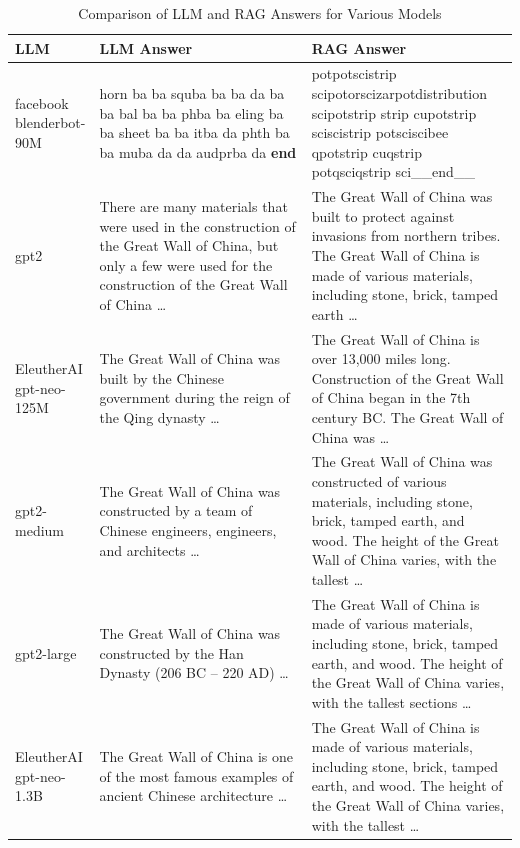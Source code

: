 \documentclass{wseas}
\begin{document}
\begin{table}[htbp]
\centering
\caption{Comparison of LLM and RAG Answers for Various Models} %
\begin{tabular}{|p{0.0977\linewidth}|p{0.4805\linewidth}|p{0.4219\linewidth}|}
\hline
\textbf{LLM} & \textbf{LLM Answer} & \textbf{RAG Answer} \\
\hline
facebook blenderbot-90M & horn ba ba squba ba ba da ba ba bal ba ba phba ba eling ba ba sheet ba ba itba da phth ba ba muba da da audprba da \textbf{end} & potpotscistrip scipotorscizarpotdistribution scipotstrip strip cupotstrip sciscistrip potsciscibee qpotstrip cuqstrip potqsciqstrip sci\_\_end\_\_ \\
\hline
gpt2 & There are many materials that were used in the construction of the Great Wall of China, but only a few were used for the construction of the Great Wall of China \ldots{} & The Great Wall of China was built to protect against invasions from northern tribes. The Great Wall of China is made of various materials, including stone, brick, tamped earth \ldots{} \\
\hline
EleutherAI gpt-neo-125M & The Great Wall of China was built by the Chinese government during the reign of the Qing dynasty \ldots{} & The Great Wall of China is over 13,000 miles long. Construction of the Great Wall of China began in the 7th century BC. The Great Wall of China was \ldots{} \\
\hline
gpt2-medium & The Great Wall of China was constructed by a team of Chinese engineers, engineers, and architects \ldots{} & The Great Wall of China was constructed of various materials, including stone, brick, tamped earth, and wood. The height of the Great Wall of China varies, with the tallest \ldots{} \\
\hline
gpt2-large & The Great Wall of China was constructed by the Han Dynasty (206 BC -- 220 AD) \ldots{} & The Great Wall of China is made of various materials, including stone, brick, tamped earth, and wood. The height of the Great Wall of China varies, with the tallest sections \ldots{} \\
\hline
EleutherAI gpt-neo-1.3B & The Great Wall of China is one of the most famous examples of ancient Chinese architecture \ldots{} & The Great Wall of China is made of various materials, including stone, brick, tamped earth, and wood. The height of the Great Wall of China varies, with the tallest \ldots{} \\
\hline
\end{tabular}
\end{table}
\end{document}
